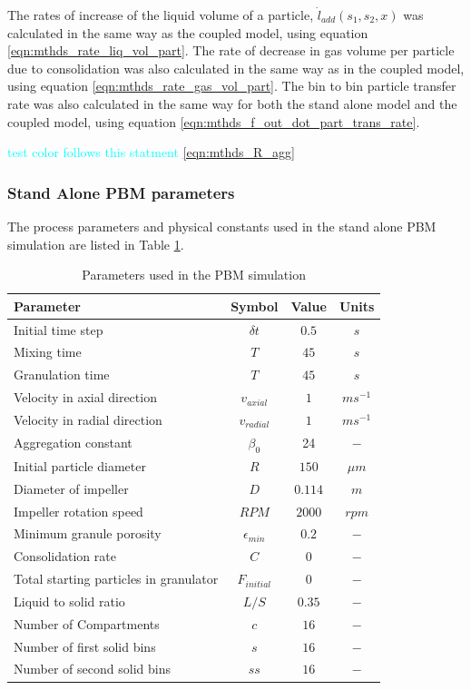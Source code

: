 The rates of increase of the liquid volume of a particle, $\dot{l}_{add}(s_1,s_2,x)$ was calculated in the same 
way as the coupled model, using equation \ref{eqn:mthds_rate_liq_vol_part}. The rate of decrease in gas volume 
per particle due to consolidation was also calculated in the same way as in the coupled model, using equation 
\ref{eqn:mthds_rate_gas_vol_part}. The bin to bin particle transfer rate was also calculated in the same way 
for both the stand alone model and the coupled model, using equation \ref{eqn:mthds_f_out_dot_part_trans_rate}.

\textcolor{cyan}{test color follows this statment} \ref{eqn:mthds_R_agg}

\subsubsection{Stand Alone PBM parameters}
The process parameters and physical constants used in the stand alone PBM simulation are listed in Table \ref{table:mthds_pbm_sa_parameters}.

\begin{table}[H]
\caption{Parameters used in the PBM simulation}
\label{table:mthds_pbm_sa_parameters}
\begin{center}
\begin{tabular}{l|c|c|c}
\hline
\bf{Parameter} &\bf{Symbol} &\bf{Value} &\bf{Units}\\
\hline
Initial time step & $\delta t$ & $0.5$ & $s$\\
Mixing time & $T$ & $45$ & $s$\\
Granulation time & $T$ & $45$ & $s$\\
Velocity in axial direction & $v_{axial}$ & $1$ & $ms^{-1}$\\
Velocity in radial direction & $v_{radial}$ & $1$ & $ms^{-1}$\\
Aggregation constant & $\beta_0$ & 24 & $-$\\
Initial particle diameter & $R$ & $150$ & $\mu m$\\
Diameter of impeller & $D$ & $0.114$ & $m$ \\
Impeller rotation speed & $RPM$ & $2000$ & $rpm$\\
Minimum granule porosity & $\epsilon_{min}$ & $0.2$ & $-$\\
Consolidation rate & $C$ & $0$ & $-$\\
Total starting particles in granulator & $F_{initial}$ & 0 & $-$\\
Liquid to solid ratio & $L/S$ & $0.35$ & $-$ \\
Number of Compartments & $c$ & $16$ & $-$ \\
Number of first solid bins & $s$ & $16$ & $-$\\
Number of second solid bins & $ss$ & $16$ & $-$\\
\hline
\end{tabular}
\end{center}
\end{table}



